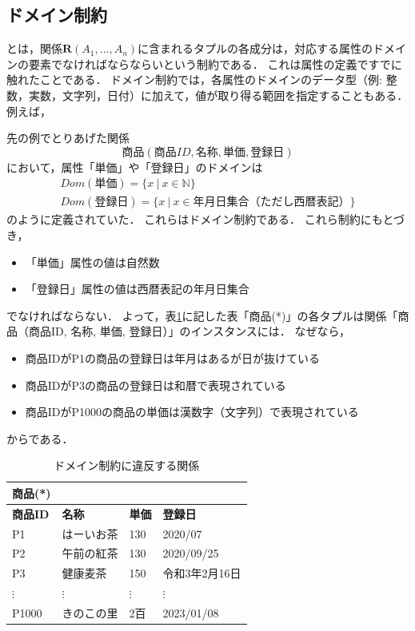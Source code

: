 \subsection{ドメイン制約}
 とは，関係$\boldsymbol{R}(A_1, ..., A_n)$に含まれるタプルの各成分は，対応する属性のドメインの要素でなければならならいという制約である．
これは属性の定義ですでに触れたことである．
ドメイン制約では，各属性のドメインのデータ型（例: 整数，実数，文字列，日付）に加えて，値が取り得る範囲を指定することもある．
例えば，

先の例でとりあげた関係
\begin{equation}
商品(商品ID, 名称, 単価, 登録日)
\end{equation}
において，属性「単価」や「登録日」のドメインは
\begin{eqnarray}
Dom(単価) = \{ x \ | \ x \in \mathbb{N} \} \\
Dom(登録日) = \{ x \ | \ x \in 年月日集合（ただし西暦表記） \}
\end{eqnarray}
のように定義されていた．
これらはドメイン制約である．
これら制約にもとづき，
\begin{itemize}
\item 「単価」属性の値は自然数
\item 「登録日」属性の値は西暦表記の年月日集合
\end{itemize}
でなければならない．
よって，表\ref{tab:incorrect-table}に記した表「商品(*)」の各タプルは関係「商品（商品ID, 名称, 単価, 登録日）」のインスタンスには．
なぜなら，
\begin{itemize}
\item 商品IDがP1の商品の登録日は年月はあるが日が抜けている
\item 商品IDがP3の商品の登録日は和暦で表現されている
\item 商品IDがP1000の商品の単価は漢数字（文字列）で表現されている
\end{itemize}
からである．

\begin{table}[tb]
\centering
\caption{ドメイン制約に違反する関係}
\label{tab:incorrect-table}
\begin{tabular}{@{}llll@{}}
商品(*)            &             &             &              \\ \midrule
\textbf{商品ID} & \textbf{名称} & \textbf{単価} & \textbf{登録日} \\ \midrule
P1            & はーいお茶       & 130         & 2020/07   \\
P2            & 午前の紅茶       & 130         & 2020/09/25   \\
P3            & 健康麦茶        & 150         & 令和3年2月16日   \\
$\vdots$      & $\vdots$    & $\vdots$    & $\vdots$     \\
P1000         & きのこの里       & 2百         & 2023/01/08   \\ \bottomrule
\end{tabular}
\end{table}


